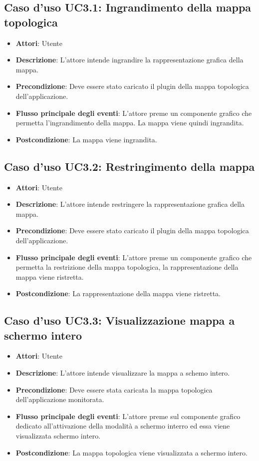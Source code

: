 \subsection{Caso d'uso UC3.1: Ingrandimento della mappa topologica}
\begin{itemize}
	\item \textbf{Attori}: Utente
	\item \textbf{Descrizione}: L'attore intende ingrandire la rappresentazione grafica della mappa.
	\item \textbf{Precondizione}: Deve essere stato caricato il plugin della mappa topologica dell'applicazione.
	\item \textbf{Flusso principale degli eventi}: L'attore preme un componente grafico che permetta l'ingrandimento della mappa. La mappa viene quindi ingrandita.
	\item \textbf{Postcondizione}: La mappa viene ingrandita.
\end{itemize}
\subsection{Caso d'uso UC3.2: Restringimento della mappa}
\begin{itemize}
	\item \textbf{Attori}: Utente
	\item \textbf{Descrizione}: L'attore intende restringere la rappresentazione grafica della mappa.
	\item \textbf{Precondizione}: Deve essere stato caricato il plugin della mappa topologica dell'applicazione.
	\item \textbf{Flusso principale degli eventi}: L'attore preme un componente grafico che permetta la restrizione della mappa topologica, la rappresentazione della mappa viene ristretta.
	\item \textbf{Postcondizione}: La rappresentazione della mappa viene ristretta.
\end{itemize}
\subsection{Caso d'uso UC3.3: Visualizzazione mappa a schermo intero}
\begin{itemize}
	\item \textbf{Attori}: Utente
	\item \textbf{Descrizione}: L'attore intende visualizzare la mappa a schemo intero.
	\item \textbf{Precondizione}: Deve essere stata caricata la mappa topologica dell'applicazione monitorata.
	\item \textbf{Flusso principale degli eventi}: L'attore preme sul componente grafico dedicato all'attivazione della modalità a schermo interro ed essa viene visualizzata schermo intero.
	\item \textbf{Postcondizione}: La mappa topologica viene visualizzata a schermo intero.
\end{itemize}

